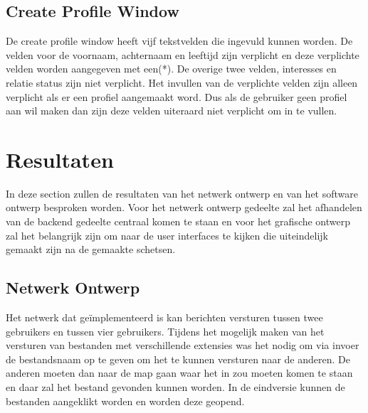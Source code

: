 \documentclass[12pt]{article}
\begin{document}
\subsection*{Create Profile Window}
\label{CPW}
De create profile window heeft vijf tekstvelden die ingevuld kunnen worden. De velden voor de voornaam, achternaam en leeftijd zijn verplicht en deze verplichte velden worden aangegeven met een(*). De overige twee velden, interesses en relatie status zijn niet verplicht. Het invullen van de verplichte velden zijn alleen verplicht als er een profiel aangemaakt word. Dus als de gebruiker geen profiel aan wil maken dan zijn deze velden uiteraard niet verplicht om in te vullen. 
\newpage

\section{Resultaten}
In deze section zullen de resultaten van het netwerk ontwerp en van het software ontwerp besproken worden. Voor het netwerk ontwerp gedeelte zal het afhandelen van de backend gedeelte centraal komen te staan en voor het grafische ontwerp zal het belangrijk zijn om naar de user interfaces te kijken die uiteindelijk gemaakt zijn na de gemaakte schetsen. 

\subsection{Netwerk Ontwerp}
Het netwerk dat ge\"implementeerd is kan berichten versturen tussen twee gebruikers en tussen vier gebruikers. Tijdens het mogelijk maken van het versturen van bestanden met verschillende extensies was het nodig om via invoer de bestandsnaam op te geven om het te kunnen versturen naar de anderen. De anderen moeten dan naar de map gaan waar het in zou moeten komen te staan en daar zal het bestand gevonden kunnen worden. In de eindversie kunnen de bestanden aangeklikt worden en worden deze geopend.
\end{document}
